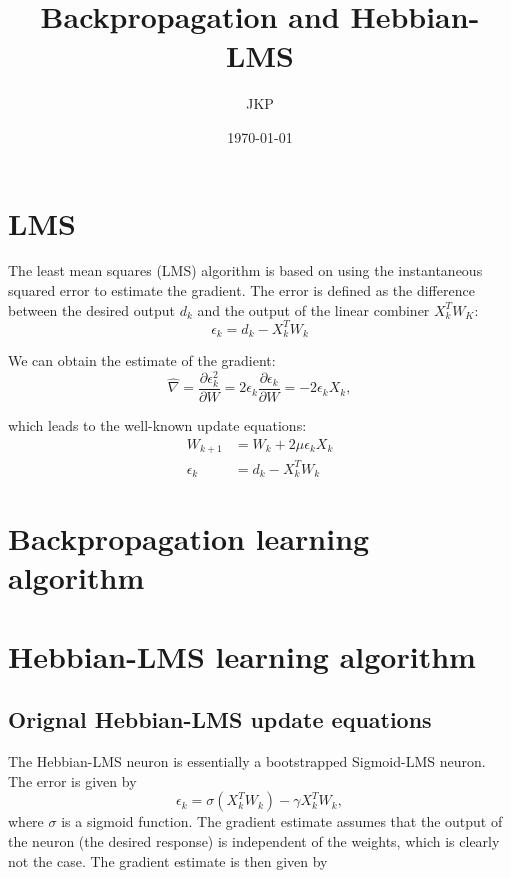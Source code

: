 \documentclass[a4paper]{article}
\title{Backpropagation and Hebbian-LMS}
\author{JKP}
\date{\today}
\begin{document}
\maketitle

\section{LMS}

The least mean squares (LMS) algorithm is based on using the instantaneous squared error to estimate the gradient. The error is defined as the difference between the desired output $d_k$ and the output of the linear combiner $X_k^TW_K$:
\begin{equation}
\epsilon_k = d_k - X_k^TW_k
\end{equation}

We can obtain the estimate of the gradient:
\begin{equation}
\hat{\nabla} = \frac{\partial\epsilon_k^2}{\partial W} = 2\epsilon_k\frac{\partial\epsilon_k}{\partial W} = -2\epsilon_kX_k,
\end{equation}

which leads to the well-known update equations:
\begin{align} \nonumber
W_{k+1} &= W_k + 2\mu\epsilon_kX_k \\
\epsilon_k &= d_k - X_k^TW_k
\end{align}

\section{Backpropagation learning algorithm}


\section{Hebbian-LMS learning algorithm}

\subsection{Orignal Hebbian-LMS update equations}

The Hebbian-LMS neuron is essentially a bootstrapped Sigmoid-LMS neuron. The error is given by
\begin{equation}
\epsilon_k = \sigma(X_k^TW_k) - \gamma X_k^TW_k,
\end{equation}
where $\sigma$ is a sigmoid function. The gradient estimate assumes that the output of the neuron (the desired response) is independent of the weights, which is clearly not the case. The gradient estimate is then given by
\end{document}
